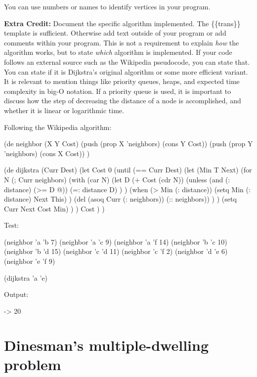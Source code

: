 You can use numbers or names to identify vertices in your program.

\textbf{Extra Credit:} Document the specific algorithm implemented. The
\{\{trans\}\} template is sufficient. Otherwise add text outside of your
program or add comments within your program. This is not a requirement
to explain \emph{how} the algorithm works, but to state \emph{which}
algorithm is implemented. If your code follows an external source such
as the Wikipedia pseudocode, you can state that. You can state if it is
Dijkstra's original algorithm or some more efficient variant. It is
relevant to mention things like priority queues, heaps, and expected
time complexity in big-O notation. If a priority queue is used, it is
important to discuss how the step of decreasing the distance of a node
is accomplished, and whether it is linear or logarithmic time.



\begin{wideverbatim}
Following the Wikipedia algorithm:

(de neighbor (X Y Cost)
   (push (prop X 'neighbors) (cons Y Cost))
   (push (prop Y 'neighbors) (cons X Cost)) )
 
(de dijkstra (Curr Dest)
   (let Cost 0
      (until (== Curr Dest)
         (let (Min T  Next)
            (for N (; Curr neighbors)
               (with (car N)
                  (let D (+ Cost (cdr N))
                     (unless (and (: distance) (>= D @))
                        (=: distance D) ) )
                  (when (> Min (: distance))
                     (setq Min (: distance)  Next This) )
                  (del (asoq Curr (: neighbors)) (:: neighbors)) ) )
            (setq Curr Next  Cost Min) ) )
      Cost ) )

Test:

(neighbor 'a 'b 7)
(neighbor 'a 'c 9)
(neighbor 'a 'f 14)
(neighbor 'b 'c 10)
(neighbor 'b 'd 15)
(neighbor 'c 'd 11)
(neighbor 'c 'f 2)
(neighbor 'd 'e 6)
(neighbor 'e 'f 9)
 
(dijkstra 'a 'e)

Output:

-> 20

\end{wideverbatim}

\pagebreak{}
\section*{Dinesman's multiple-dwelling problem}

